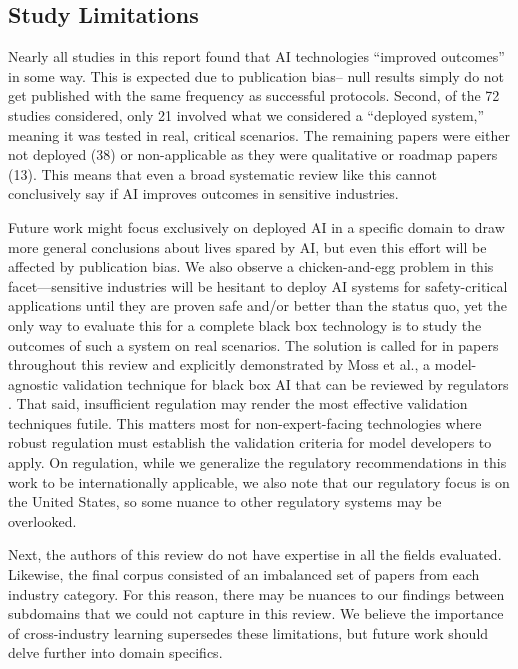 \documentclass[authoryear,preprint,12pt]{elsarticle}
\begin{document}
\subsection{Study Limitations}
\label{sec:studylimits}
Nearly all studies in this report found that AI technologies ``improved
outcomes'' in some way. This is expected due to publication bias-- null results
simply do not get published with the same frequency as successful protocols.
Second, of the 72 studies considered, only 21 involved what we considered a
``deployed system,'' meaning it was tested in real, critical scenarios. The
remaining papers were either not deployed (38) or non-applicable as they were
qualitative or roadmap papers (13). This means that even a broad systematic
review like this cannot conclusively say if AI improves outcomes in sensitive
industries. 

Future work might focus exclusively on deployed AI in a specific domain to draw
more general conclusions about lives spared by AI, but even this effort will be
affected by publication bias. We also observe a chicken-and-egg problem in this
facet---sensitive industries will be hesitant to deploy AI systems for
safety-critical applications until they are proven safe and/or better than the
status quo, yet the only way to evaluate this for a complete black box
technology is to study the outcomes of such a system on real scenarios. The
solution is called for in papers throughout this review and explicitly
demonstrated by Moss et al., a model-agnostic validation technique for black box
AI that can be reviewed by regulators \cite{mossBayesianSafetyValidation2024}.
That said, insufficient regulation may render the most effective validation
techniques futile. This matters most for non-expert-facing technologies where
robust regulation must establish the validation criteria for model developers to
apply. On regulation, while we generalize the regulatory recommendations in this
work to be internationally applicable, we also note that our regulatory focus is
on the United States, so some nuance to other regulatory systems may be
overlooked. 

Next, the authors of this review do not have expertise in all the fields
evaluated. Likewise, the final corpus consisted of an imbalanced set of
papers from each industry category. For this reason, there may be nuances to our
findings between subdomains that we could not capture in this review. We believe
the importance of cross-industry learning supersedes these limitations, but
future work should delve further into domain specifics.
\end{document}

